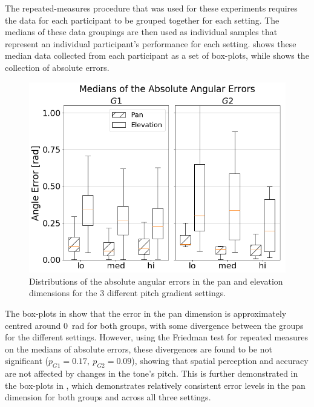 \documentclass[]{interact}
\begin{document}
The repeated-measures procedure that was used for these experiments requires the data for each participant to be grouped together for each setting.
The medians of these data groupings are then used as individual samples that represent an individual participant's performance for each setting.
 shows these median data collected from each participant as a set of box-plots, while  shows the collection of absolute errors.

\begin{figure}[t]
  \centering
  \includegraphics[width=1.0\textwidth]{figures/boxplot_target_search_absolute_median_error.png}
  \caption{Distributions of the absolute angular errors in the pan and elevation dimensions for the 3 different pitch gradient settings. }\label{fig:target-boxplot-absolute-errors}
\end{figure}

The box-plots in  show that the error in the pan dimension is approximately centred around \SI{0}{\radian} for both groups, with some divergence between the groups for the different settings.
However, using the Friedman test for repeated measures on the medians of absolute errors, these divergences are found to be not significant ($p_{G1} = 0.17,~p_{G2} = 0.09$), showing that spatial perception and accuracy are not affected by changes in the tone's pitch.
This is further demonstrated in the box-plots in , which demonstrates relatively consistent error levels in the pan dimension for both groups and across all three settings. 
\end{document}
